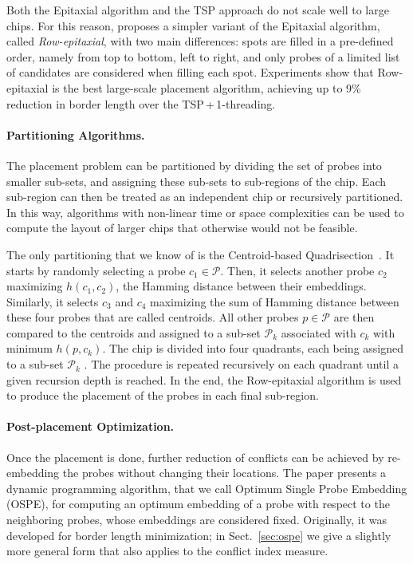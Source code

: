 \documentclass{llncs}
\begin{document}
Both the Epitaxial algorithm and the TSP approach do not scale well to large
chips. For this reason, \cite{KAHNG03A} proposes a simpler variant of the
Epitaxial algorithm, called \emph{Row-epitaxial}, with two main differences:
spots are filled in a pre-defined order, namely from top to bottom, left to
right, and only probes of a limited list of candidates are considered when
filling each spot. Experiments show that Row-epitaxial is the best
large-scale placement algorithm, achieving up to 9\% reduction in border
length over the TSP\,+\,1-threading.


\paragraph{Partitioning Algorithms.}
The placement problem can be partitioned by dividing the set of probes into
smaller sub-sets, and assigning these sub-sets to sub-regions of the chip.
Each sub-region can then be treated as an independent chip or recursively
partitioned. In this way, algorithms with non-linear time or space
complexities can be used to compute the layout of larger chips that otherwise
would not be feasible.

The only partitioning that we know of is the Centroid-based
Quadrisection~\cite{KAHNG03B}. It starts by randomly selecting a probe
$c_1 \in \mathcal{P}$. Then, it selects another probe $c_2$ maximizing
$h(c_1,c_2)$, the Hamming distance between their embeddings. Similarly, it
selects $c_3$ and $c_4$ maximizing the sum of Hamming distance between these
four probes that are called centroids. All other probes $p \in \mathcal{P}$
are then compared to the centroids and assigned to a sub-set $\mathcal{P}_k$
associated with $c_k$ with minimum $h(p,c_k)$. The chip is divided into four
quadrants, each being assigned to a sub-set $\mathcal{P}_k$ .  The procedure
is repeated recursively on each quadrant until a given recursion depth is
reached. In the end, the Row-epitaxial algorithm is used to produce the
placement of the probes in each final sub-region.


\paragraph{Post-placement Optimization.}
Once the placement is done, further reduction of conflicts can be achieved by
re-embedding the probes without changing their locations.  The paper
\cite{KAHNG02} presents a dynamic programming algorithm, that we call Optimum
Single Probe Embedding (OSPE), for computing an optimum embedding of a probe
with respect to the neighboring probes, whose
embeddings are considered fixed.  Originally, it was developed for border
length minimization; in Sect.~\ref{sec:ospe} we give a slightly more
general form that also applies to the conflict index measure.
\end{document}
